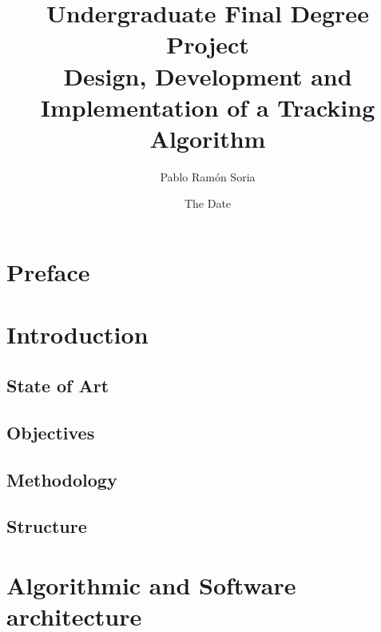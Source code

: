 \documentclass{book} %
\begin{document}
\frontmatter
\title{Undergraduate Final Degree Project \\ Design, Development and Implementation of a Tracking Algorithm}
\author{Pablo Ram\'on Soria}
\date{The Date}
\maketitle

\tableofcontents

\chapter{Preface}


\chapter{Introduction}
\section{State of Art}


\section{Objectives}


\section{Methodology}


\section{Structure}



\mainmatter


\chapter{Algorithmic and Software architecture}
\end{document}
